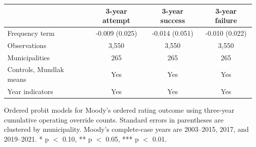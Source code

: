 \begin{center}
\scriptsize
\begin{tabular}{lccc}
\toprule
 & 3-year attempt & 3-year success & 3-year failure \\
\midrule
Frequency term & -0.009 (0.025) & -0.014 (0.051) & -0.010 (0.022) \\
Observations & 3,550 & 3,550 & 3,550 \\
Municipalities & 265 & 265 & 265 \\
Controls, Mundlak means & Yes & Yes & Yes \\
Year indicators & Yes & Yes & Yes \\
\bottomrule
\end{tabular}
\vspace{0.05cm}
\parbox{0.94\textwidth}{\tiny Ordered probit models for Moody's ordered rating outcome using three-year cumulative operating override counts. Standard errors in parentheses are clustered by municipality. Moody's complete-case years are 2003--2015, 2017, and 2019--2021. * p $<$ 0.10, ** p $<$ 0.05, *** p $<$ 0.01.}
\end{center}
